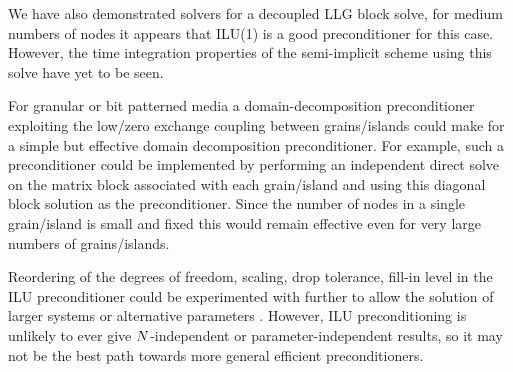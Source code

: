 We have also demonstrated solvers for a decoupled LLG block solve, for medium numbers of nodes it appears that ILU(1) is a good preconditioner for this case.
However, the time integration properties of the semi-implicit scheme using this solve have yet to be seen.


For granular or bit patterned media a domain-decomposition preconditioner exploiting the low/zero exchange coupling between grains/islands could make for a simple but effective domain decomposition preconditioner.
For example, such a preconditioner could be implemented by performing an independent direct solve on the matrix block associated with each grain/island and using this diagonal block solution as the preconditioner.
Since the number of nodes in a single grain/island is small and fixed this would remain effective even for very large numbers of grains/islands.

Reordering of the degrees of freedom, scaling, drop tolerance, fill-in level in the ILU preconditioner could be experimented with further to allow the solution of larger systems or alternative parameters \cite[287]{Saad2000}.
However, ILU preconditioning is unlikely to ever give $N$-independent or parameter-independent results, so it may not be the best path towards more general efficient preconditioners.




